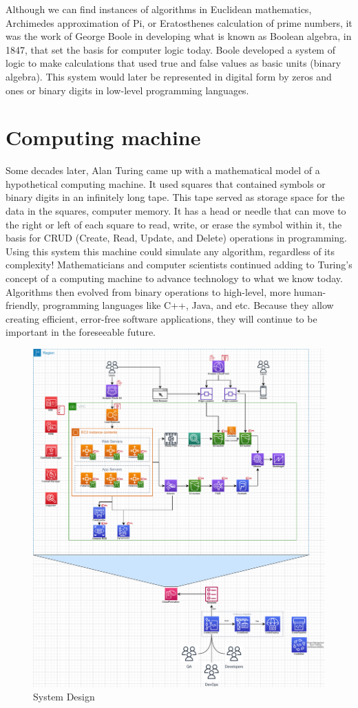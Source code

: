 Although we can find instances of algorithms in Euclidean mathematics,\\
Archimedes approximation of Pi, or Eratosthenes calculation of prime numbers, it was the work of George Boole in developing what is known as Boolean algebra, in 1847, that set the basis for computer logic today. Boole developed a system of logic to make calculations that used true and false values as basic units (binary algebra). This system would later be represented in digital form by zeros and ones or binary digits in low-level programming languages. \\ 

\section{Computing machine}

Some decades later, Alan Turing came up with a mathematical model of a hypothetical computing machine. It used squares that contained symbols or binary digits in an infinitely long tape. This tape served as storage space for the data in the squares, computer memory. It has a head or needle that can move to the right or left of each square to read, write, or erase the symbol within it, the basis for CRUD (Create, Read, Update, and Delete) operations in programming. Using this system this machine could simulate any algorithm, regardless of its complexity!
Mathematicians and computer scientists continued adding to Turing's concept of a computing machine to advance technology to what we know today. Algorithms then evolved from binary operations to high-level, more human-friendly, programming languages like C++, Java, and etc. Because they allow creating efficient, error-free software applications, they will continue to be important in the foreseeable future. \\ 


\begin{figure}[h]
    \centering
    \includegraphics[scale=0.7]{figures/sys.pdf}
    \caption{System Design}
    \label{fig:gp}
\end{figure}
